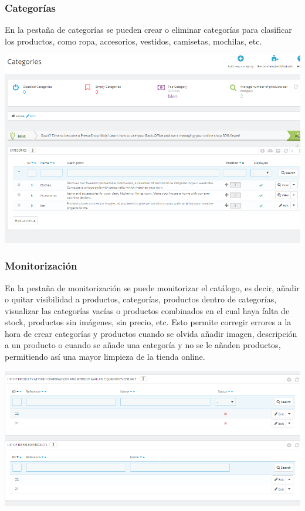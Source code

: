 \documentclass{article}
\begin{document}
\subsubsection{Categorías}

En la pestaña de categorías se pueden crear o eliminar categorías para clasificar los productos, como ropa, accesorios, vestidos, camisetas, mochilas, etc.

\begin{center}
\includegraphics[scale=0.4]{images/categorias.png}
\end{center}

\subsubsection{Monitorización}

En la pestaña de monitorización se puede monitorizar el catálogo, es decir, añadir o quitar visibilidad a productos, categorías, productos dentro de categorías, visualizar las categorías vacías o productos combinados en el cual haya falta de stock, productos sin imágenes, sin precio, etc. Esto permite corregir errores a la hora de crear categorías y productos cuando se olvida añadir imagen, descripción a un producto o cuando se añade una categoría y no se le añaden productos, permitiendo así una mayor limpieza de la tienda online.

\begin{center}
\includegraphics[scale=0.4]{images/monitoring.png}
\end{center}
\end{document}

